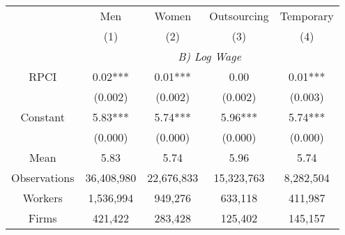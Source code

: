 \begin{tabular}{ccccc}
\toprule
\toprule
      & Men   & Women & Outsourcing & Temporary \\
      & (1)   & (2)   & (3)   & (4) \\
\cmidrule{2-5}      & \multicolumn{4}{c}{\textit{B) Log Wage}} \\
\midrule
RPCI  & 0.02*** & 0.01*** & 0.00  & 0.01*** \\
      & (0.002) & (0.002) & (0.002) & (0.003) \\
Constant & 5.83*** & 5.74*** & 5.96*** & 5.74*** \\
      & (0.000) & (0.000) & (0.000) & (0.000) \\
Mean  & 5.83  & 5.74  & 5.96  & 5.74 \\
\midrule
Observations & 36,408,980 & 22,676,833 & 15,323,763 & 8,282,504 \\
Workers & 1,536,994 & 949,276 & 633,118 & 411,987 \\
Firms & 421,422 & 283,428 & 125,402 & 145,157 \\
\bottomrule
\bottomrule
\end{tabular}%
